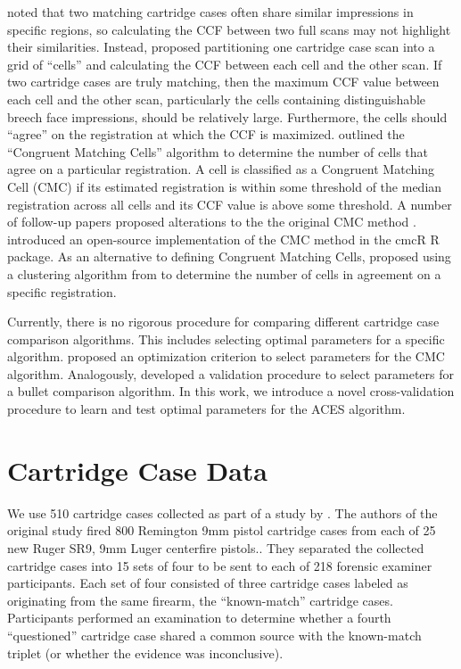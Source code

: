 \documentclass[11pt,]{isuthesis}
\begin{document}
\citet{song_proposed_2013} noted that two matching cartridge cases often share similar impressions in specific regions, so calculating the CCF between two full scans may not highlight their similarities.
Instead, \citet{song_proposed_2013} proposed partitioning one cartridge case scan into a grid of ``cells'' and calculating the CCF between each cell and the other scan.
If two cartridge cases are truly matching, then the maximum CCF value between each cell and the other scan, particularly the cells containing distinguishable breech face impressions, should be relatively large.
Furthermore, the cells should ``agree'' on the registration at which the CCF is maximized.
\citet{song_proposed_2013} outlined the ``Congruent Matching Cells'' algorithm to determine the number of cells that agree on a particular registration.
A cell is classified as a Congruent Matching Cell (CMC) if its estimated registration is within some threshold of the median registration across all cells and its CCF value is above some threshold.
A number of follow-up papers proposed alterations to the the original CMC method \citep{tong_improved_2015, chen_convergence_2017}.
\citet{cmcR} introduced an open-source implementation of the CMC method in the cmcR R package.
As an alternative to defining Congruent Matching Cells, \citet{zhang_convergence_2021} proposed using a clustering algorithm from \citet{Ester1996} to determine the number of cells in agreement on a specific registration.

Currently, there is no rigorous procedure for comparing different cartridge case comparison algorithms.
This includes selecting optimal parameters for a specific algorithm.
\citet{Zemmels2023} proposed an optimization criterion to select parameters for the CMC algorithm.
Analogously, \citet{hare_automatic_2016} developed a validation procedure to select parameters for a bullet comparison algorithm.
In this work, we introduce a novel cross-validation procedure to learn and test optimal parameters for the ACES algorithm.

\hypertarget{cartridge-case-data}{%
\section{Cartridge Case Data}\label{cartridge-case-data}}

We use 510 cartridge cases collected as part of a study by \citet{Baldwin2014}.
The authors of the original study fired 800 Remington 9mm pistol cartridge cases from each of 25 new Ruger SR9, 9mm Luger centerfire pistols..
They separated the collected cartridge cases into 15 sets of four to be sent to each of 218 forensic examiner participants.
Each set of four consisted of three cartridge cases labeled as originating from the same firearm, the ``known-match'' cartridge cases.
Participants performed an examination to determine whether a fourth ``questioned'' cartridge case shared a common source with the known-match triplet (or whether the evidence was inconclusive).
\end{document}
